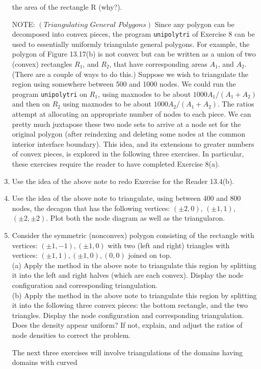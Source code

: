 \documentclass[../main.tex]{subfiles}
\begin{document}
\begin{enumerate}
the area of the rectangle R (why?).
	\item[NOTE:]$(\textit{Triangulating General Polygons})$ Since any polygon can be decomposed into convex pieces, 
the program \texttt{unipolytri} of Exercise 8 can be used to essentially uniformly triangulate general 
polygons. For example, the polygon of Figure 13.17(b) is not convex but can be written as a union of 
two (convex) rectangles $R_1$, and $R_2$, that have corresponding areas $A_1$, and $A_2$. (There are a couple 
of ways to do this.) Suppose we wish to triangulate the region using somewhere between 500 and 1000 
nodes. We could run the program \texttt{unipolytri}  on $R_1$, using maxnodes to be about 
$1000A_1/(A_1 + A_2)$ and then on $R_2$ using maxnodes to be about $1000A_2/(A_1 + A_2)$. The ratios attempt 
at allocating an appropriate number of nodes to each piece. We can pretty much juxtapose these two 
node sets to arrive at a node set for the original polygon (after reindexing and deleting some nodes at 
the common interior interface boundary). This idea, and its extensions to greater numbers of convex 
pieces, is explored in the following three exercises. In particular, these exercises require the reader to 
have completed Exercise 8(a).
	\item Use the idea of the above note to redo Exercise for the Reader 13.4(b).
	\item Use the idea of the above note to triangulate, using between 400 and 800 nodes, the decagon 
that has the following vertices: $(\pm2,0)$, $(\pm1, 1)$, $(\pm2, \pm2)$. Plot both the node diagram as well as 
the triangularon. 
	\item Consider the symmetric (nonconvex) polygon consisting of the rectangle with vertices: 
$(\pm1,-1), (\pm1,0)$ with two (left and right) triangles with vertices: $(\pm1,1), (\pm1,0), (0,0)$ joined 
on top. 
\\
(a) Apply the method in the above note to triangulate this region by splitting it into the left and 
right halves (which are each convex). Display the node configuration and corresponding 
triangulation.
\\ 
(b) Apply the method in the above note to triangulate this region by splitting it into the 
following three convex pieces: the bottom rectangle, and the two triangles. Display the node 
configuration and corresponding triangulation. Does the density appear uniform? If not, 
explain, and adjust the ratios of node densities to correct the problem.
\\
	\item[] The next three exercises will involve triangulations of the domains having domains with curved 

\end{enumerate}
\end{document}
